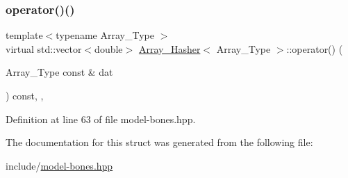 \subsubsection{\texorpdfstring{operator()()}{operator()()}}
{\footnotesize\ttfamily template$<$typename Array\+\_\+\+Type $>$ \\
virtual std\+::vector$<$double$>$ \hyperlink{struct_array___hasher}{Array\+\_\+\+Hasher}$<$ Array\+\_\+\+Type $>$\+::operator() (\begin{DoxyParamCaption}\item[{Array\+\_\+\+Type const \&}]{dat }\end{DoxyParamCaption}) const\hspace{0.3cm}{\ttfamily [inline]}, {\ttfamily [virtual]}, {\ttfamily [noexcept]}}



Definition at line 63 of file model-\/bones.\+hpp.



The documentation for this struct was generated from the following file\+:\begin{DoxyCompactItemize}
\item 
include/\hyperlink{model-bones_8hpp}{model-\/bones.\+hpp}\end{DoxyCompactItemize}
